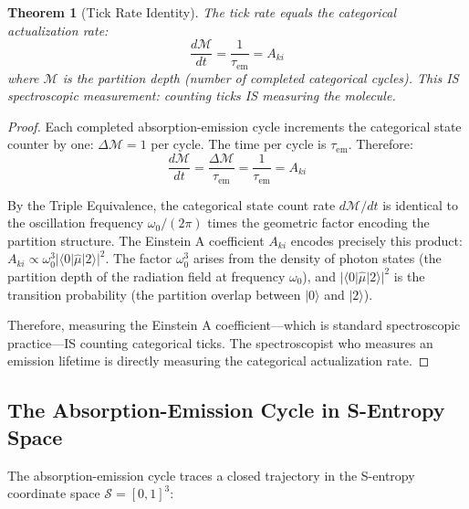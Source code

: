 \documentclass[11pt,a4paper]{article}
\newtheorem{theorem}{Theorem}[section]
\theoremstyle{definition}
\theoremstyle{remark}
\newcommand{\Sspace}{\mathcal{S}}
\newcommand{\Depth}{\mathcal{M}}
\newcommand{\tem}{\tau_{\mathrm{em}}}
\newcommand{\Aki}{A_{ki}}
\begin{document}
\begin{theorem}[Tick Rate Identity]
\label{thm:tick_rate}
The tick rate equals the categorical actualization rate:
\begin{equation}
\frac{d\Depth}{dt} = \frac{1}{\tem} = \Aki
\label{eq:tick_rate}
\end{equation}
where $\Depth$ is the partition depth (number of completed categorical cycles). This IS spectroscopic measurement: counting ticks IS measuring the molecule.
\end{theorem}

\begin{proof}
Each completed absorption-emission cycle increments the categorical state counter by one: $\Delta\Depth = 1$ per cycle. The time per cycle is $\tem$. Therefore:
\begin{equation}
\frac{d\Depth}{dt} = \frac{\Delta\Depth}{\tem} = \frac{1}{\tem} = \Aki
\end{equation}

By the Triple Equivalence, the categorical state count rate $d\Depth/dt$ is identical to the oscillation frequency $\omega_0/(2\pi)$ times the geometric factor encoding the partition structure. The Einstein A coefficient $\Aki$ encodes precisely this product: $\Aki \propto \omega_0^3 |\langle 0|\hat{\mu}|2\rangle|^2$. The factor $\omega_0^3$ arises from the density of photon states (the partition depth of the radiation field at frequency $\omega_0$), and $|\langle 0|\hat{\mu}|2\rangle|^2$ is the transition probability (the partition overlap between $|0\rangle$ and $|2\rangle$).

Therefore, measuring the Einstein A coefficient---which is standard spectroscopic practice---IS counting categorical ticks. The spectroscopist who measures an emission lifetime is directly measuring the categorical actualization rate.
\end{proof}

\subsection{The Absorption-Emission Cycle in S-Entropy Space}

The absorption-emission cycle traces a closed trajectory in the S-entropy coordinate space $\Sspace = [0,1]^3$:
\end{document}
